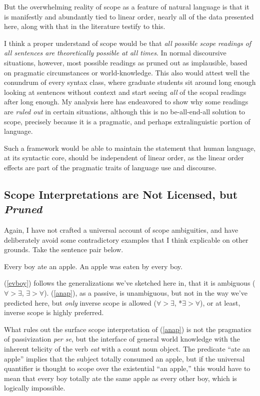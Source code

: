 \documentclass{article}
\begin{document}
But the overwhelming reality of scope as a feature of natural language is that it is manifestly and abundantly tied to linear order, nearly all of the data presented here, along with that in the literature testify to this.

I think a proper understand of scope would be that \emph{all possible scope readings of all sentences are theoretically possible at all times}. In normal discoursive situations, however, most possible readings as pruned out as implausible, based on pragmatic circumstances or world-knowledge. This also would attest well the conundrum of every syntax class, where graduate students sit around long enough looking at sentences without context and start seeing \emph{all} of the scopal readings after long enough. My analysis here has endeavored to show why some readings are \emph{ruled out} in certain situations, although this is no be-all-end-all solution to scope, precisely because it is a pragmatic, and perhaps extralinguistic portion of language.

Such a framework would be able to maintain the statement that human language, at its syntactic core, should be independent of linear order, as the linear order effects are part of the pragmatic traits of language use and discourse.

\subsection{Scope Interpretations are Not Licensed, but \emph{Pruned}}

Again, I have not crafted a universal account of scope ambiguities, and have deliberately avoid some contradictory examples that I think explicable on other grounds. Take the sentence pair below.

\begin{exe}
\ex Every boy ate an apple.\label{evboy}
\ex An apple was eaten by every boy.\label{anap}
\end{exe}

(\ref{evboy}) follows the generalizations we've sketched here in, that it is ambiguous ($\forall>\exists$, $\exists>\forall$). (\ref{anap}), as a passive, is unambiguous, but not in the way we've predicted here, but \emph{only} inverse scope is allowed ($\forall>\exists$, *$\exists>\forall$), or at least, inverse scope is highly preferred.


What rules out the surface scope interpretation of (\ref{anap}) is not the pragmatics of passivization \emph{per se}, but the interface of general world knowledge with the inherent telicity of the verb \emph{eat} with a count noun object. The predicate ``ate an apple'' implies that the subject totally consumed an apple, but if the universal quantifier is thought to scope over the existential ``an apple,'' this would have to mean that every boy totally ate the same apple as every other boy, which is logically impossible.
\end{document}

